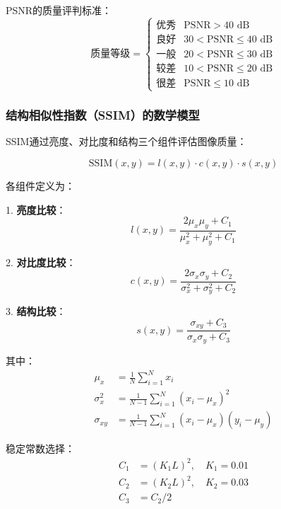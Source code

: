 \documentclass[a4paper,12pt]{ctexart}
\begin{document}
PSNR的质量评判标准：
\begin{equation}
\text{质量等级} = \begin{cases}
\text{优秀} & \text{PSNR} > 40 \text{ dB} \\
\text{良好} & 30 < \text{PSNR} \leq 40 \text{ dB} \\
\text{一般} & 20 < \text{PSNR} \leq 30 \text{ dB} \\
\text{较差} & 10 < \text{PSNR} \leq 20 \text{ dB} \\
\text{很差} & \text{PSNR} \leq 10 \text{ dB}
\end{cases}
\end{equation}

\subsubsection{结构相似性指数（SSIM）的数学模型}

SSIM通过亮度、对比度和结构三个组件评估图像质量：

\begin{equation}
\text{SSIM}(x,y) = l(x,y) \cdot c(x,y) \cdot s(x,y)
\end{equation}

各组件定义为：

1. \textbf{亮度比较}：
\begin{equation}
l(x,y) = \frac{2\mu_x\mu_y + C_1}{\mu_x^2 + \mu_y^2 + C_1}
\end{equation}

2. \textbf{对比度比较}：
\begin{equation}
c(x,y) = \frac{2\sigma_x\sigma_y + C_2}{\sigma_x^2 + \sigma_y^2 + C_2}
\end{equation}

3. \textbf{结构比较}：
\begin{equation}
s(x,y) = \frac{\sigma_{xy} + C_3}{\sigma_x\sigma_y + C_3}
\end{equation}

其中：
\begin{align}
\mu_x &= \frac{1}{N} \sum_{i=1}^{N} x_i \\
\sigma_x^2 &= \frac{1}{N-1} \sum_{i=1}^{N} (x_i - \mu_x)^2 \\
\sigma_{xy} &= \frac{1}{N-1} \sum_{i=1}^{N} (x_i - \mu_x)(y_i - \mu_y)
\end{align}

稳定常数选择：
\begin{align}
C_1 &= (K_1 L)^2, \quad K_1 = 0.01 \\
C_2 &= (K_2 L)^2, \quad K_2 = 0.03 \\
C_3 &= C_2/2
\end{align}
\end{document}

